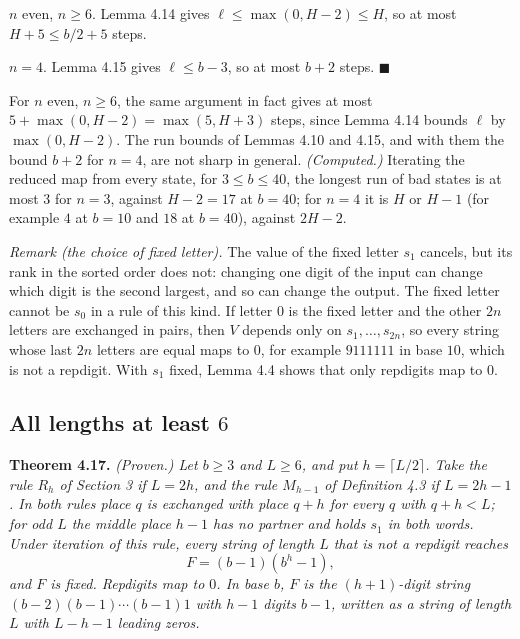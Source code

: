 \documentclass[11pt,letterpaper]{article}
\theoremstyle{paperstyle}
\theoremstyle{paperstyledef}
\theoremstyle{paperstylerem}
\begin{document}
\(n\) even, \(n \geq 6\). Lemma 4.14 gives \(\ell \leq \max(0, H - 2) \leq H\), so at most \(H + 5 \leq b/2 + 5\) steps.

\(n = 4\). Lemma 4.15 gives \(\ell \leq b - 3\), so at most \(b + 2\) steps. \(\blacksquare\)

For \(n\) even, \(n \geq 6\), the same argument in fact gives at most \(5 + \max(0, H-2) = \max(5, H+3)\) steps, since Lemma 4.14 bounds \(\ell\) by \(\max(0, H-2)\). The run bounds of Lemmas 4.10 and 4.15, and with them the bound \(b + 2\) for \(n = 4\), are not sharp in general. \emph{(Computed.)} Iterating the reduced map from every state, for \(3 \leq b \leq 40\), the longest run of bad states is at most \(3\) for \(n = 3\), against \(H - 2 = 17\) at \(b = 40\); for \(n = 4\) it is \(H\) or \(H - 1\) (for example \(4\) at \(b = 10\) and \(18\) at \(b = 40\)), against \(2H - 2\).

\emph{Remark (the choice of fixed letter).} The value of the fixed letter \(s_1\) cancels, but its rank in the sorted order does not: changing one digit of the input can change which digit is the second largest, and so can change the output. The fixed letter cannot be \(s_0\) in a rule of this kind. If letter \(0\) is the fixed letter and the other \(2n\) letters are exchanged in pairs, then \(V\) depends only on \(s_1, \dots, s_{2n}\), so every string whose last \(2n\) letters are equal maps to \(0\), for example \(9111111\) in base \(10\), which is not a repdigit. With \(s_1\) fixed, Lemma 4.4 shows that only repdigits map to \(0\).

\subsection{\texorpdfstring{All lengths at least \(6\)}{All lengths at least 6}}\label{all-lengths-at-least-6}

\textbf{Theorem 4.17.} \emph{(Proven.) Let \(b \geq 3\) and \(L \geq 6\), and put \(h = \lceil L/2 \rceil\). Take the rule \(R_h\) of Section 3 if \(L = 2h\), and the rule \(M_{h-1}\) of Definition 4.3 if \(L = 2h - 1\). In both rules place \(q\) is exchanged with place \(q + h\) for every \(q\) with \(q + h < L\); for odd \(L\) the middle place \(h - 1\) has no partner and holds \(s_1\) in both words. Under iteration of this rule, every string of length \(L\) that is not a repdigit reaches} \[F = (b-1)(b^h - 1),\] \emph{and \(F\) is fixed. Repdigits map to \(0\). In base \(b\), \(F\) is the \((h+1)\)-digit string \((b-2)(b-1)\cdots(b-1)1\) with \(h - 1\) digits \(b-1\), written as a string of length \(L\) with \(L - h - 1\) leading zeros.}
\end{document}
